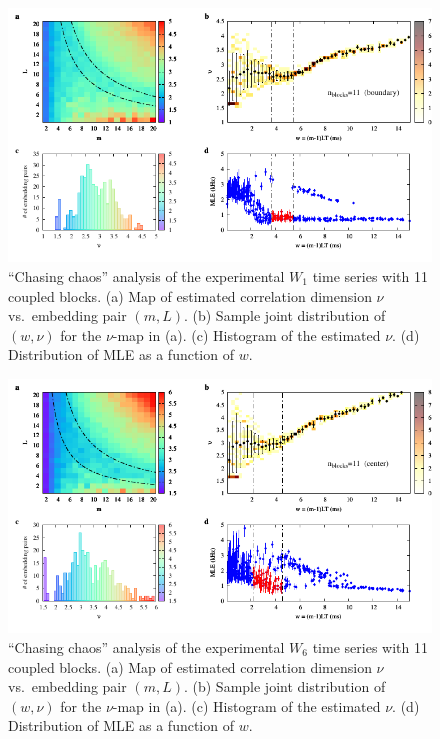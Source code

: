 \begin{appendices}
\begin{figure}[!htbp]
    \centering
    \includegraphics[width=\linewidth]{../blocks/11_blocks/edge/2e5_points/plots/chaos_low.pdf}
    \caption{``Chasing chaos'' analysis of the experimental $W_1$ time series with 11 coupled blocks.
    (a) Map of estimated correlation dimension $\nu$ vs.\ embedding pair $(m, L)$.
    (b) Sample joint distribution of $(w,\nu)$ for the $\nu$-map in (a).
    (c) Histogram of the estimated $\nu$. (d) Distribution of MLE as a function of $w$.
    } 
\end{figure}

\begin{figure}[!htbp]
    \centering
    \includegraphics[width=\linewidth]{../blocks/11_blocks/middle/2e5_points/plots/chaos_low.pdf}
    \caption{``Chasing chaos'' analysis of the experimental $W_6$ time series with 11 coupled blocks.
    (a) Map of estimated correlation dimension $\nu$ vs.\ embedding pair $(m, L)$.
    (b) Sample joint distribution of $(w,\nu)$ for the $\nu$-map in (a).
    (c) Histogram of the estimated $\nu$. (d) Distribution of MLE as a function of $w$.
    } 
\end{figure}


\end{appendices}
